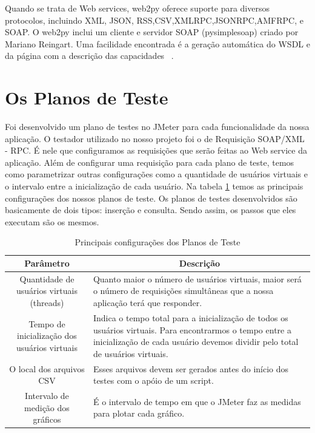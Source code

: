 Quando se trata de Web services, web2py oferece suporte para diversos protocolos, incluindo XML, JSON, RSS,CSV,XMLRPC,JSONRPC,AMFRPC, e SOAP.  O web2py inclui um cliente e servidor SOAP (pysimplesoap) criado por Mariano Reingart. Uma facilidade encontrada é a geração automática do WSDL e da página com a descrição das capacidades ~\cite{siteweb2py}.

\section{Os Planos de Teste}

Foi desenvolvido um plano de testes no JMeter para cada funcionalidade da nossa aplicação. O testador utilizado no nosso projeto foi o de Requisição SOAP/XML - RPC. É nele que configuramos as requisições que serão feitas ao Web service da aplicação. Além de configurar uma requisição para cada plano de teste, temos como parametrizar outras configurações como a quantidade de usuários virtuais e o intervalo entre a inicialização de cada usuário. Na tabela \ref{tab:configplanoteste} temos as principais configurações dos nossos planos de teste. Os planos de testes desenvolvidos são basicamente de dois tipos: inserção e consulta. Sendo assim, os passos que eles executam são os mesmos.

\begin{table}
	\caption{Principais configurações dos Planos de Teste}
	\begin{center}
	\begin{tabularx}{\textwidth}{ | c | X | }
	\hline
		\textbf{Parâmetro} & \multicolumn{1}{c|}{\textbf{Descrição}} \\
	\hline
		Quantidade de usuários virtuais (threads) & Quanto maior o número de usuários virtuais, maior será o número de requisições simultâneas que a nossa aplicação terá que responder.\\
	\hline 
		Tempo de inicialização dos usuários virtuais & Indica o tempo total para a inicialização de todos os usuários virtuais. Para encontrarmos o tempo entre a inicialização de cada usuário devemos dividir pelo total de usuários virtuais.\\
	\hline
		O local dos arquivos CSV & Esses arquivos devem ser gerados antes do início dos testes com o apóio de um script.\\
	\hline
		Intervalo de medição dos gráficos & É o intervalo de tempo em que o JMeter faz as medidas para plotar cada gráfico.\\
	\hline
	\end {tabularx}
	\end{center}
	\label{tab:configplanoteste}
\end{table}

